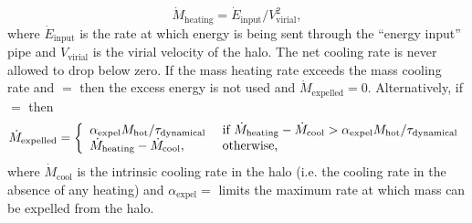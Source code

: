 \begin{equation}
 \dot{M}_\mathrm{heating} = \dot{E}_\mathrm{input} / V_\mathrm{virial}^2,
\end{equation}
where $\dot{E}_\mathrm{input}$ is the rate at which energy is being sent through the ``energy input'' pipe and $V_\mathrm{virial}$ is the virial velocity of the halo. The net cooling rate is never allowed to drop below zero. If the mass heating rate exceeds the mass cooling rate and \mono{[hotHaloExcessHeatDrivesOutflow]}$=$ then the excess energy is not used and $\dot{M}_\mathrm{expelled}=0$. Alternatively, if \mono{[hotHaloExcessHeatDrivesOutflow]}$=$ then
\begin{equation}
 \dot{M}_\mathrm{expelled} = \left\{ \begin{array}{ll} \alpha_\mathrm{expel} M_\mathrm{hot}/\tau_\mathrm{dynamical} & \hbox{ if } \dot{M}_\mathrm{heating} - \dot{M}_\mathrm{cool} > \alpha_\mathrm{expel} M_\mathrm{hot}/\tau_\mathrm{dynamical} \\ \dot{M}_\mathrm{heating} - \dot{M}_\mathrm{cool}, & \hbox{ otherwise,} \end{array} \right.
\end{equation}
where $\dot{M}_\mathrm{cool}$ is the intrinsic cooling rate in the halo (i.e. the cooling rate in the absence of any heating) and $\alpha_\mathrm{expel}=$\mono{[hotHaloExpulsionRateMaximum]} limits the maximum rate at which mass can be expelled from the halo.


